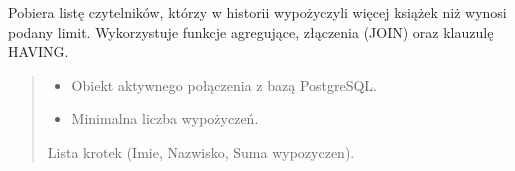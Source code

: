\documentclass[a4paper,11pt,english,openany,oneside]{sphinxmanual}
\begin{document}
\begin{savenotes}\begin{fulllineitems}
\label{\detokenize{rozdzial_5/index:biblioteka_zapytania.get_aktywni_czytelnicy_powyzej_limitu}}
\pysigstartsignatures
\pysiglinewithargsret
{}
{\sphinxparamcomma {}}
{}
\pysigstopsignatures
\sphinxAtStartPar
Pobiera listę czytelników, którzy w historii wypożyczyli więcej książek niż wynosi podany limit.
Wykorzystuje funkcje agregujące, złączenia (JOIN) oraz klauzulę HAVING.

\sphinxAtStartPar
{}

\begin{sphinxVerbatim}[commandchars=\\\{\}]
\end{sphinxVerbatim}
\begin{quote}\begin{description}
\begin{itemize}
\item {} 
\sphinxAtStartPar
{} \textendash{} Obiekt aktywnego połączenia z bazą PostgreSQL.

\item {} 
\sphinxAtStartPar
{} \textendash{} Minimalna liczba wypożyczeń.

\end{itemize}

\sphinxAtStartPar
Lista krotek (Imie, Nazwisko, Suma wypozyczen).

\end{description}\end{quote}

\end{fulllineitems}\end{savenotes}
\end{document}
